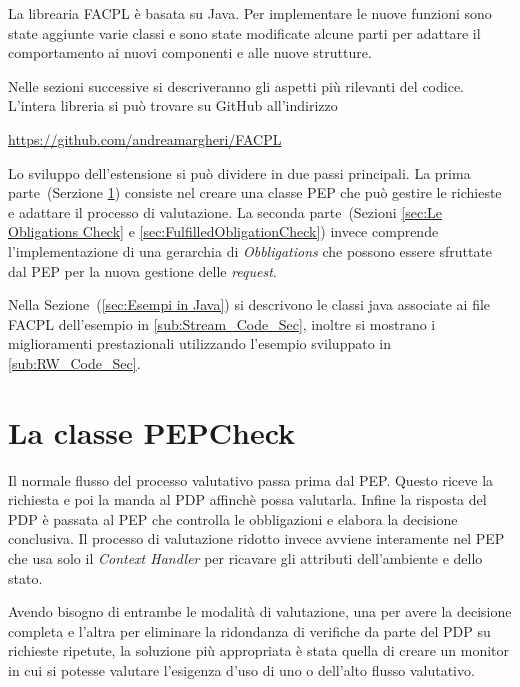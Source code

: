 \label{chap:Estensione della libreria FACPL}
La librearia \ac{FACPL} è basata su Java. Per implementare le nuove funzioni sono state aggiunte varie classi e sono state modificate
alcune parti per adattare il comportamento ai nuovi componenti e alle nuove strutture.\par
Nelle sezioni successive si descriveranno gli aspetti più rilevanti del codice. L'intera libreria si può trovare su
GitHub all'indirizzo
\begin{center}
  \url{https://github.com/andreamargheri/FACPL}
\end{center}
Lo sviluppo dell'estensione si può dividere in due passi principali.
La prima parte~(Serzione \ref{sec:PEPCheck}) consiste nel creare una classe \ac{PEP} che può gestire le richieste e adattare il processo di valutazione.
La seconda parte~(Sezioni \ref{sec:Le Obligations Check} e \ref{sec:FulfilledObligationCheck})
invece comprende l'implementazione di una gerarchia di \emph{Obbligations} che possono essere
sfruttate dal \ac{PEP} per la nuova gestione delle \emph{request}. \par
Nella Sezione~(\ref{sec:Esempi in Java}) si descrivono le classi java associate ai file \ac{FACPL}
dell'esempio in \ref{sub:Stream_Code_Sec}, inoltre si mostrano i miglioramenti
prestazionali utilizzando l'esempio sviluppato in \ref{sub:RW_Code_Sec}.
\section{La classe PEPCheck}
\label{sec:PEPCheck}
Il normale flusso del processo valutativo passa prima dal \ac{PEP}. Questo riceve la richiesta e poi la manda al
PDP affinchè possa valutarla. Infine la risposta del PDP è passata al \ac{PEP} che controlla le obbligazioni e
elabora la decisione conclusiva.
Il processo di valutazione ridotto invece avviene interamente nel \ac{PEP} che usa solo il \emph{Context Handler}
per ricavare gli attributi dell'ambiente e dello stato.

Avendo bisogno di entrambe le modalità di valutazione, una per avere la decisione completa e l'altra per eliminare la
ridondanza di verifiche da parte del \ac{PDP} su richieste ripetute,
la soluzione più appropriata è stata quella di creare un monitor
in cui si potesse valutare l'esigenza d'uso di uno o dell'alto flusso valutativo.

